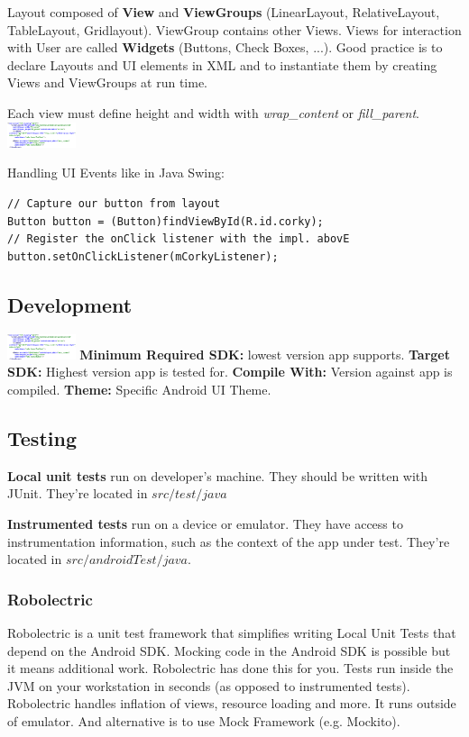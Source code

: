 Layout composed of \textbf{View} and \textbf{ViewGroups} (LinearLayout,
RelativeLayout, TableLayout, Gridlayout). ViewGroup contains other Views. Views
for interaction with User are called \textbf{Widgets} (Buttons, Check Boxes,
...). Good practice is to declare Layouts and UI elements in XML and to
instantiate them by creating Views and ViewGroups at run time.

Each view must define height and width with \textit{wrap\_content} or
\textit{fill\_parent}.
\includegraphics[width=0.15\textwidth]{android/view_example.png}

Handling UI Events like in Java Swing:
\begin{lstlisting}
// Capture our button from layout
Button button = (Button)findViewById(R.id.corky);
// Register the onClick listener with the impl. abovE
button.setOnClickListener(mCorkyListener);
\end{lstlisting}

\subsection{Development}
\includegraphics[width=0.15\textwidth]{android/view_example.png}
\textbf{Minimum Required SDK:} lowest version app supports.
\textbf{Target SDK:} Highest version app is tested for.
\textbf{Compile With:} Version against app is compiled.
\textbf{Theme:} Specific Android UI Theme.

\subsection{Testing}
\textbf{Local unit tests} run on developer’s machine. They should be written
with JUnit. They're located in $src/test/java$

\textbf{Instrumented tests} run on a device or emulator. They have access to
instrumentation information, such as the context of the app under test. They're
located in $src/androidTest/java$.

\subsubsection{Robolectric}
Robolectric is a unit test framework that simplifies writing Local Unit Tests
that depend on the Android SDK. Mocking code in the Android SDK is possible but
it means additional work.  Robolectric has done this for you. Tests run inside
the JVM on your workstation in seconds (as opposed to instrumented tests).
Robolectric handles inflation of views, resource loading and more. It runs
outside of emulator. And alternative is to use Mock Framework (e.g. Mockito).

